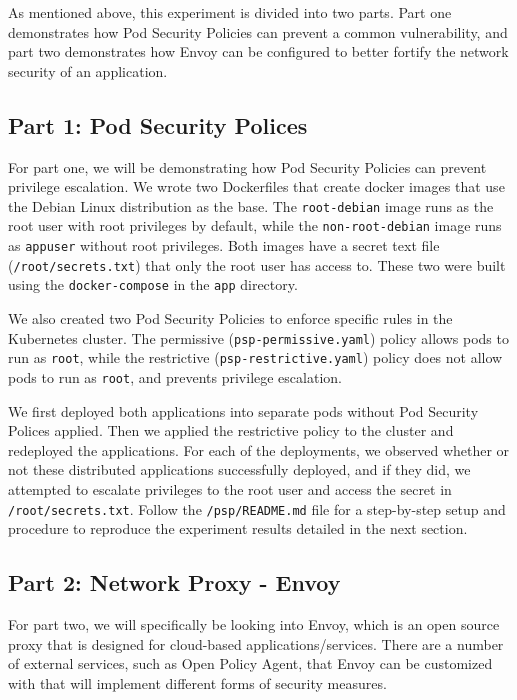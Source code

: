 As mentioned above, this experiment is divided into two parts. Part one demonstrates 
how Pod Security Policies can prevent a common vulnerability, and part two demonstrates 
how Envoy can be configured to better fortify the network security of an application.

\subsection{Part 1: Pod Security Polices}
For part one, we will be  demonstrating how Pod Security Policies can prevent privilege 
escalation. We wrote two Dockerfiles that create docker images that use the Debian Linux 
distribution as the base. The \verb|root-debian| image runs as the root user with root 
privileges by default, while the \verb|non-root-debian| image runs as \verb|appuser| 
without root privileges. Both images have a secret text file (\verb|/root/secrets.txt|) 
that only the root user has access to. These two were built using the \verb|docker-compose| 
in the \verb|app| directory. 

We also created two Pod Security Policies to enforce specific rules in the Kubernetes cluster. 
The permissive (\verb|psp-permissive.yaml|) policy allows pods to run as \verb|root|, while 
the restrictive (\verb|psp-restrictive.yaml|) policy does not allow pods to run as \verb|root|, 
and prevents privilege escalation. 

We first deployed both applications into separate pods without Pod Security Polices applied. 
Then we applied the restrictive policy to the cluster and redeployed the applications. 
For each of the deployments, we observed whether or not these distributed applications successfully 
deployed, and if they did, we attempted to escalate privileges to the root user and access the 
secret in \verb|/root/secrets.txt|. Follow the \verb|/psp/README.md| file for a step-by-step 
setup and procedure to reproduce the experiment results detailed in the next section.

\subsection{Part 2: Network Proxy - Envoy}
For part two, we will specifically be looking into Envoy, which is an open source proxy that is 
designed for cloud-based applications/services. There are a number of external services, such as 
Open Policy Agent, that Envoy can be customized with that will implement different forms of 
security measures. 

